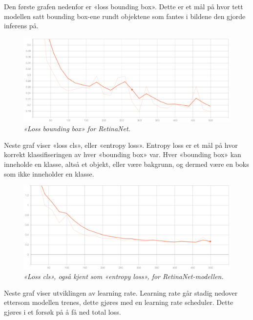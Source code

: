 Den første grafen nedenfor er «loss bounding box». Dette er et mål på hvor tett modellen satt bounding box-ene rundt objektene som fantes i bildene den gjorde inferens på.

\begin{figure}[H]
\begin{center} 
\includegraphics[scale=0.35]{figures/loss_box_reg_retinanet_3}
\caption{\small \sl «Loss bounding box» for RetinaNet. \label{fig:loss_box_reg_retinanet}}
\end{center}
\end{figure}

Neste graf viser «loss cls», eller «entropy loss». Entropy loss er et mål på hvor korrekt klassifiseringen av hver «bounding box» var. Hver «bounding box» kan inneholde en klasse, altså et objekt, eller være bakgrunn, og dermed være en boks som ikke inneholder en klasse.

\begin{figure}[H]
\begin{center} 
\includegraphics[scale=0.35]{figures/loss_cls_retinanet_4}
\caption{\small \sl «Loss cls», også kjent som «entropy loss», for RetinaNet-modellen. \label{fig:loss_cls_retinanet}}
\end{center}
\end{figure}

Neste graf viser utviklingen av learning rate. Learning rate går stadig nedover ettersom modellen trenes, dette gjøres med en learning rate scheduler. Dette gjøres i et forsøk på å få ned total loss.

